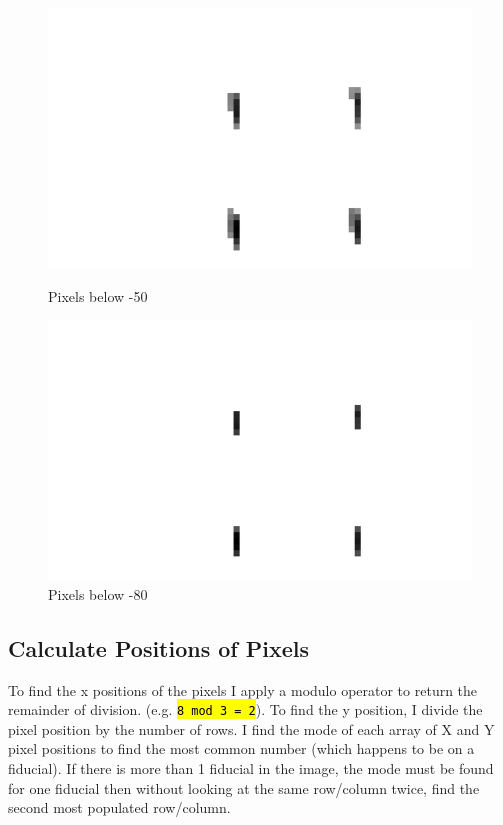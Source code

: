 \documentclass[10pt]{article}
\begin{document}
    \begin{figure}[h]
        \begin{minipage}{0.4\textwidth}
            \begin{center}
                \includegraphics[width=.75\linewidth]{../plots_tables_images/below50.png}
                \caption{Pixels below -50}
            \end{center}
        \end{minipage}
        \begin{minipage}{0.4\textwidth}
            \begin{center}
                \includegraphics[width=.75\linewidth]{../plots_tables_images/below80.png}
                \caption{Pixels below -80}
            \end{center}
        \end{minipage}
    \end{figure}

    \subsection{Calculate Positions of Pixels} %
    \label{sub:calculate_positions_of_pixels}
    To find the x positions of the pixels I apply a modulo operator to return the remainder of division. (e.g. \hl{\texttt{8 mod 3 = 2}}). To find the y position, I divide the pixel position by the number of rows. I find the mode of each array of X and Y pixel positions to find the most common number (which happens to be on a fiducial). If there is more than 1 fiducial in the image, the mode must be found for one fiducial then without looking at the same row/column twice, find the second most populated row/column.
\end{document}
